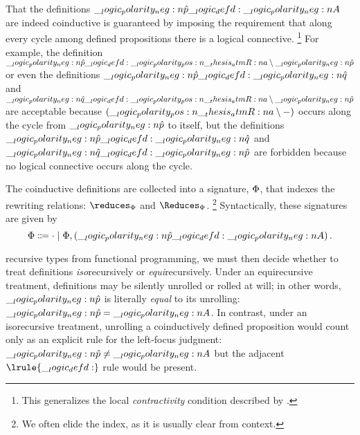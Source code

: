 That the definitions $\__logic_polarity_neg:n {\hat{p}} \__logic_defd: \__logic_polarity_neg:n {A}$ are indeed coinductive is guaranteed by imposing the requirement that along every cycle among defined propositions there is a logical connective.%
\footnote{This generalizes the local \emph{contractivity} condition described by \textcite{??}.}
For example, the definition $\__logic_polarity_neg:n {\hat{p}} \__logic_defd: \__logic_polarity_pos:n {\__thesis_atmR:n {a}} \mathbin { \setminus } \__logic_polarity_neg:n {\hat{p}}$ or even the definitions $\__logic_polarity_neg:n {\hat{p}} \__logic_defd: \__logic_polarity_neg:n {\hat{q}}$ and $\__logic_polarity_neg:n {\hat{q}} \__logic_defd: \__logic_polarity_pos:n {\__thesis_atmR:n {a}} \mathbin { \setminus } \__logic_polarity_neg:n {\hat{p}}$ are acceptable because $(\__logic_polarity_pos:n {\__thesis_atmR:n {a}} \mathbin { \setminus } \mathord{-})$ occurs along the cycle from $\__logic_polarity_neg:n {\hat{p}}$ to itself, but the definitions $\__logic_polarity_neg:n {\hat{p}} \__logic_defd: \__logic_polarity_neg:n {\hat{q}}$ and $\__logic_polarity_neg:n {\hat{q}} \__logic_defd: \__logic_polarity_neg:n {\hat{p}}$ are forbidden because no logical connective occurs along the cycle.



The coinductive definitions are collected into a signature, $\Phi$, that indexes the rewriting relations: $\reduces_{\orsig}$ and $\Reduces_{\orsig}$.%
\footnote{We often elide the index, as it is usually clear from context.}
Syntactically, these signatures are given by
\begin{equation*}
  \Phi \Coloneqq \cdot \mid \Phi, (\__logic_polarity_neg:n {\hat{p}} \__logic_defd: \__logic_polarity_neg:n {A})
  \,.
\end{equation*}

 recursive types from functional programming\autocite{??}, we must then decide whether to treat definitions \emph{iso}\-recursively or \emph{equi}\-recursively.
Under an equirecursive treatment, definitions may be silently unrolled or rolled at will;
in other words, $\__logic_polarity_neg:n {\hat{p}}$ is literally \emph{equal} to its unrolling: $\__logic_polarity_neg:n {\hat{p}} = \__logic_polarity_neg:n {A}$.
In contrast, under an isorecursive treatment, unrolling a coinductively defined proposition would count only as an explicit rule for the left-focus judgment: $\__logic_polarity_neg:n {\hat{p}} \neq \__logic_polarity_neg:n {A}$ but the adjacent $\lrule{\defd}$ rule would be present.%

